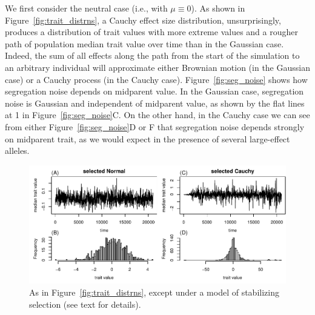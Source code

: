\documentclass{article}
\theoremstyle{remark}
\theoremstyle{definition}
\begin{document}
We first consider the neutral case (i.e., with $\mu \equiv 0$).
As shown in Figure~\ref{fig:trait_distrns},
a Cauchy effect size distribution, unsurprisingly,
produces a distribution of trait values with more extreme values
and a rougher path of population median trait value over time
than in the Gaussian case.
Indeed, the sum of all effects along the path from the start of the simulation
to an arbitrary individual will approximate either Brownian motion (in the Gaussian case)
or a Cauchy process (in the Cauchy case).
Figure~\ref{fig:seg_noise} shows how segregation noise
depends on midparent value.
In the Gaussian case, segregation noise is Gaussian and independent of midparent value,
as shown by the flat lines at 1 in Figure~\ref{fig:seg_noise}C. 
On the other hand, in the Cauchy case we can see from either Figure~\ref{fig:seg_noise}D or F
that segregation noise depends strongly on midparent trait,
as we would expect in the presence of several large-effect alleles.

\begin{figure}
    \begin{center}
        \includegraphics{sims/selected_trait_traces}
    \end{center}
    \caption{
        As in Figure~\ref{fig:trait_distrns},
        except under a model of stabilizing selection (see text for details).
        \label{fig:sel_trait_distrns}
    }
\end{figure}
\end{document}
